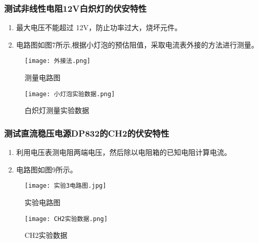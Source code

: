\documentclass[dvipsnames, svgnames,a4paper,11pt]{article}
\begin{document}
	
		
	 
	 
	 	
	 
	 
		\subsubsection{测试非线性电阻12V白炽灯的伏安特性}
		\begin{enumerate}
			\item 最大电压不能超过 12V，防止功率过大，烧坏元件。
			\item 电路图如图7所示,根据小灯泡的预估阻值，采取电流表外接的方法进行测量。
		
		\end{enumerate}
		\begin{figure}[H]
			\centering
			\begin{minipage}[b]{0.4\linewidth}
				\centering
				\texttt{[image: 外接法.png]}
				\caption{测量电路图}
				\label{白炽灯测量电路图}
			\end{minipage}
			\hfill
			\begin{minipage}[b]{0.4\linewidth}
				\centering
				\texttt{[image: 小灯泡实验数据.png]}
				\caption{白炽灯测量实验数据}
				\label{白炽灯测量实验数据}
			\end{minipage}
		\end{figure}
		
			\subsubsection{测试直流稳压电源DP832的CH2的伏安特性}
			\begin{enumerate}
				\item 利用电压表测电阻两端电压，然后除以电阻箱的已知电阻计算电流。
				\item 电路图如图9所示。
				
			\end{enumerate}
			\begin{figure}[H]
				\centering
				\begin{minipage}[b]{0.5\linewidth}
					\centering
					\texttt{[image: 实验3电路图.jpg]}
					\caption{实验电路图}
				\end{minipage}
				\hfill
				\begin{minipage}[b]{0.3\linewidth}
					\centering
					\texttt{[image: CH2实验数据.png]}
					\caption{CH2实验数据}
					\label{CH2实验数据}
				\end{minipage}
			\end{figure}
		
\end{document}
